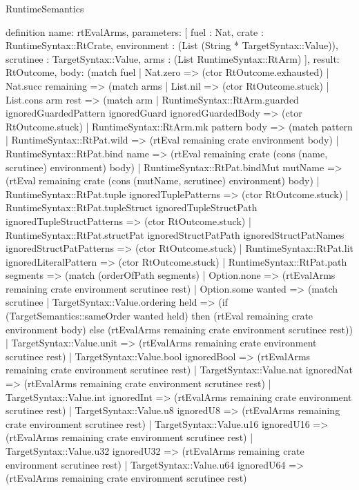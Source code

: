 \begin{lexlean}{RuntimeSemantics}
\begin{semanticmodule}
definition{
  name: rtEvalArms,
  parameters: [
    fuel : Nat,
    crate : RuntimeSyntax::RtCrate,
    environment : (List (String * TargetSyntax::Value)),
    scrutinee : TargetSyntax::Value,
    arms : (List RuntimeSyntax::RtArm)
  ],
  result: RtOutcome,
  body: (match fuel
    | Nat.zero => (ctor RtOutcome.exhausted)
    | Nat.succ remaining => (match arms
      | List.nil => (ctor RtOutcome.stuck)
      | List.cons arm rest => (match arm
        | RuntimeSyntax::RtArm.guarded ignoredGuardedPattern ignoredGuard ignoredGuardedBody => (ctor RtOutcome.stuck)
        | RuntimeSyntax::RtArm.mk pattern body => (match pattern
          | RuntimeSyntax::RtPat.wild => (rtEval remaining crate environment body)
          | RuntimeSyntax::RtPat.bind name => (rtEval remaining crate (cons (name, scrutinee) environment) body)
          | RuntimeSyntax::RtPat.bindMut mutName => (rtEval remaining crate (cons (mutName, scrutinee) environment) body)
          | RuntimeSyntax::RtPat.tuple ignoredTuplePatterns => (ctor RtOutcome.stuck)
          | RuntimeSyntax::RtPat.tupleStruct ignoredTupleStructPath ignoredTupleStructPatterns => (ctor RtOutcome.stuck)
          | RuntimeSyntax::RtPat.structPat ignoredStructPatPath ignoredStructPatNames ignoredStructPatPatterns => (ctor RtOutcome.stuck)
          | RuntimeSyntax::RtPat.lit ignoredLiteralPattern => (ctor RtOutcome.stuck)
          | RuntimeSyntax::RtPat.path segments => (match (orderOfPath segments)
            | Option.none => (rtEvalArms remaining crate environment scrutinee rest)
            | Option.some wanted => (match scrutinee
              | TargetSyntax::Value.ordering held => (if (TargetSemantics::sameOrder wanted held) then (rtEval remaining crate environment body) else (rtEvalArms remaining crate environment scrutinee rest))
              | TargetSyntax::Value.unit => (rtEvalArms remaining crate environment scrutinee rest)
              | TargetSyntax::Value.bool ignoredBool => (rtEvalArms remaining crate environment scrutinee rest)
              | TargetSyntax::Value.nat ignoredNat => (rtEvalArms remaining crate environment scrutinee rest)
              | TargetSyntax::Value.int ignoredInt => (rtEvalArms remaining crate environment scrutinee rest)
              | TargetSyntax::Value.u8 ignoredU8 => (rtEvalArms remaining crate environment scrutinee rest)
              | TargetSyntax::Value.u16 ignoredU16 => (rtEvalArms remaining crate environment scrutinee rest)
              | TargetSyntax::Value.u32 ignoredU32 => (rtEvalArms remaining crate environment scrutinee rest)
              | TargetSyntax::Value.u64 ignoredU64 => (rtEvalArms remaining crate environment scrutinee rest)
}
\end{semanticmodule}
\end{lexlean}
